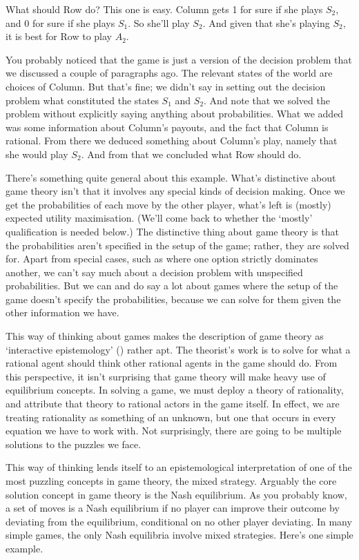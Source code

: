 \documentclass[
  11pt,
  letterpaper,
  DIV=11,
  numbers=noendperiod,
  twoside]{scrartcl}
\begin{document}
What should Row do? This one is easy. Column gets 1 for sure if she
plays \(S_2\), and 0 for sure if she plays \(S_1\). So she'll play
\(S_2\). And given that she's playing \(S_2\), it is best for Row to
play \(A_2\).

You probably noticed that the game is just a version of the decision
problem that we discussed a couple of paragraphs ago. The relevant
states of the world are choices of Column. But that's fine; we didn't
say in setting out the decision problem what constituted the states
\(S_1\) and \(S_2\). And note that we solved the problem without
explicitly saying anything about probabilities. What we added was some
information about Column's payouts, and the fact that Column is
rational. From there we deduced something about Column's play, namely
that she would play \(S_2\). And from that we concluded what Row should
do.

There's something quite general about this example. What's distinctive
about game theory isn't that it involves any special kinds of decision
making. Once we get the probabilities of each move by the other player,
what's left is (mostly) expected utility maximisation. (We'll come back
to whether the `mostly' qualification is needed below.) The distinctive
thing about game theory is that the probabilities aren't specified in
the setup of the game; rather, they are solved for. Apart from special
cases, such as where one option strictly dominates another, we can't say
much about a decision problem with unspecified probabilities. But we can
and do say a lot about games where the setup of the game doesn't specify
the probabilities, because we can solve for them given the other
information we have.

This way of thinking about games makes the description of game theory as
`interactive epistemology' ()
rather apt. The theorist's work is to solve for what a rational agent
should think other rational agents in the game should do. From this
perspective, it isn't surprising that game theory will make heavy use of
equilibrium concepts. In solving a game, we must deploy a theory of
rationality, and attribute that theory to rational actors in the game
itself. In effect, we are treating rationality as something of an
unknown, but one that occurs in every equation we have to work with. Not
surprisingly, there are going to be multiple solutions to the puzzles we
face.

This way of thinking lends itself to an epistemological interpretation
of one of the most puzzling concepts in game theory, the mixed strategy.
Arguably the core solution concept in game theory is the Nash
equilibrium. As you probably know, a set of moves is a Nash equilibrium
if no player can improve their outcome by deviating from the
equilibrium, conditional on no other player deviating. In many simple
games, the only Nash equilibria involve mixed strategies. Here's one
simple example.
\end{document}
